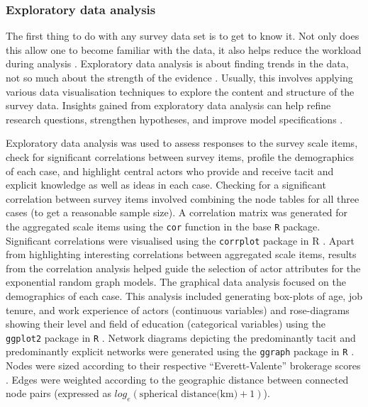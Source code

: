 \subsubsection{Exploratory data analysis}

The first thing to do with any survey data set is to get to know it. Not only does this allow one to become familiar with the data, it also helps reduce the workload during analysis \citep{cox2017translating}. Exploratory data analysis is about finding trends in the data, not so much about the strength of the evidence \citep{morgenthaler2009exploratory}. Usually, this involves applying various data visualisation techniques to explore the content and structure of the survey data. Insights gained from exploratory data analysis can help refine research questions, strengthen hypotheses, and improve model specifications \citep{jebb2017exploratory}. \medskip

Exploratory data analysis was used to assess responses to the survey scale items, check for significant correlations between survey items, profile the demographics of each case, and highlight central actors who provide and receive tacit and explicit knowledge as well as ideas in each case. Checking for a significant correlation between survey items involved combining the node tables for all three cases (to get a reasonable sample size). A correlation matrix was generated for the aggregated scale items using the \texttt{cor} function in the base \texttt{R} package. Significant correlations were visualised using the \texttt{corrplot} package in R \citep{wei2017corrplot}. Apart from highlighting interesting correlations between aggregated scale items, results from the correlation analysis helped guide the selection of actor attributes for the exponential random graph models. The graphical data analysis focused on the demographics of each case. This analysis included generating box-plots of age, job tenure, and work experience of actors (continuous variables) and rose-diagrams showing their level and field of education (categorical variables) using the \texttt{ggplot2} package in \texttt{R} \citep{wickham2016ggplot2}. Network diagrams depicting the predominantly tacit and predominantly explicit networks were generated using the \texttt{ggraph} package in \texttt{R} \citep{pedersen2019ggraph}. Nodes were sized according to their respective \enquote{Everett-Valente} brokerage scores \citep{everett2016bridging}. Edges were weighted according to the geographic distance between connected node pairs (expressed as $log_e(\text{spherical distance(km)} + 1)$). 

